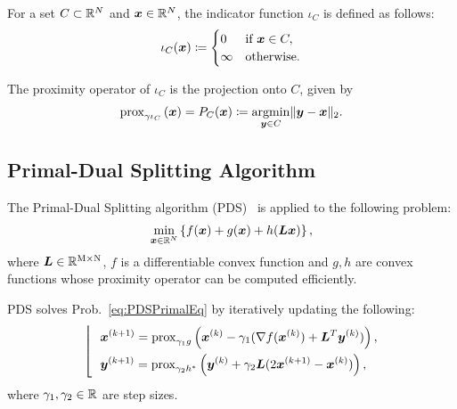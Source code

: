 For a set $C \subset \mathbb{R}^N$ and $\bm{x} \in \mathbb{R}^N$, the indicator function $\iota_C$ is defined as follows:
\begin{equation} \label{eq:IndicatorFunctionDefinitionEq} \iota_{C}(\bm{x}) \coloneq \begin{cases} 0 & \text{if } \bm{x} \in C, \\ \infty & \text{otherwise}. \end{cases} \end{equation}

The proximity operator of $\iota_C$ is the projection onto $C$, given by
\begin{equation} \label{eq:ProximityOperatorDefinitionWithIndicatorFunctionEq}
\mathrm{prox}_{ \gamma \iota_{C} }\left(\bm{x}\right) = P_C(\bm{x}) \coloneq \underset{\bm{y} \in C}{\mathrm{argmin}} \lVert \bm{y} - \bm{x} \rVert _2.
\end{equation}



\subsection{Primal-Dual Splitting Algorithm}\label{subsec:primal-dual-splitting-algorithm}
The Primal-Dual Splitting algorithm (PDS)~\cite{PDS0,PDS1,PDS2,PDS3} is applied to the following problem:
\begin{equation} \label{eq:PDSPrimalEq} \underset{ \bm{x} \in \mathbb{R}^N }{\mathrm{min}} \left\{ f(\bm{x}) + g(\bm{x}) + h(\bm{L} \bm{x}) \right\}, \end{equation}
where $\bm{L} \in \mathbb{R}^{\mathrm{M} \times \mathrm{N}}$, $f$ is a differentiable convex function and $g,h$ are convex functions whose proximity operator can be computed efficiently.

PDS solves Prob.~\eqref{eq:PDSPrimalEq} by iteratively updating the following:
\begin{equation} \label{eq:PDSSubStep} \left \lfloor \ \ \begin{aligned} & \bm{x}^{(k+1)} = \mathrm{prox}_{\gamma_1 g}\left(\bm{x}^{(k)} - \gamma_1( \nabla f(\bm{x}^{(k)}) + \bm{L}^T \bm{y}^{(k)} )\right), \\ & \bm{y}^{(k+1)} = \mathrm{prox}_{\gamma_2 h^*}\left(\bm{y}^{(k)} + \gamma_2 \bm{L} (2\bm{x}^{(k+1)} - \bm{x}^{(k)}) \right), \\ \end{aligned} \right. \end{equation}
where $\gamma_1, \gamma_2 \in \mathbb{R}$ are step sizes.


